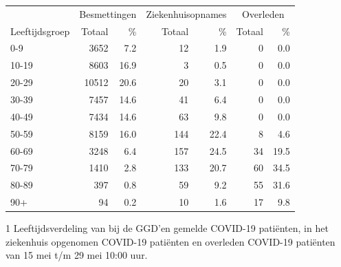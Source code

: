 \documentclass[
  english,
  man,floatsintext]{apa6}
\begin{document}
\begin{table}
\centering\begingroup\fontsize{11}{13}\selectfont

\begin{threeparttable}
\begin{tabular}{lrrrrrr}
\toprule
\multicolumn{1}{c}{ } & \multicolumn{2}{c}{Besmettingen} & \multicolumn{2}{c}{Ziekenhuisopnames} & \multicolumn{2}{c}{Overleden} \\
\cmidrule(l{3pt}r{3pt}){2-3} \cmidrule(l{3pt}r{3pt}){4-5} \cmidrule(l{3pt}r{3pt}){6-7}
Leeftijdsgroep & Totaal & \% & Totaal & \% & Totaal & \%\\
\midrule
0-9 & 3652 & 7.2 & 12 & 1.9 & 0 & 0.0\\
10-19 & 8603 & 16.9 & 3 & 0.5 & 0 & 0.0\\
20-29 & 10512 & 20.6 & 20 & 3.1 & 0 & 0.0\\
30-39 & 7457 & 14.6 & 41 & 6.4 & 0 & 0.0\\
40-49 & 7434 & 14.6 & 63 & 9.8 & 0 & 0.0\\
50-59 & 8159 & 16.0 & 144 & 22.4 & 8 & 4.6\\
60-69 & 3248 & 6.4 & 157 & 24.5 & 34 & 19.5\\
70-79 & 1410 & 2.8 & 133 & 20.7 & 60 & 34.5\\
80-89 & 397 & 0.8 & 59 & 9.2 & 55 & 31.6\\
90+ & 94 & 0.2 & 10 & 1.6 & 17 & 9.8\\
\bottomrule
\end{tabular}
\begin{tablenotes}
\item[1] Leeftijdsverdeling van bij de GGD’en gemelde COVID-19 patiënten, in het ziekenhuis opgenomen COVID-19 patiënten en overleden COVID-19 patiënten van 15 mei t/m 29 mei 10:00 uur.
\end{tablenotes}
\end{threeparttable}
\endgroup{}
\end{table}

\newpage
\end{document}
